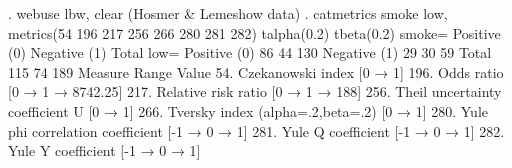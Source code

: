 . webuse lbw, clear
(Hosmer \& Lemeshow data)
{\smallskip}
. catmetrics smoke low, metrics(54 196 217 256 266 280 281 282) talpha(0.2) tbeta(0.2)
{\smallskip}
{}
{\smallskip}
      smoke= {\VBAR}    Positive (0)    Negative (1) {\VBAR}    Total 
        low= {\VBAR}                                 {\VBAR}
Positive (0) {\VBAR}              86              44 {\VBAR}      130 
Negative (1) {\VBAR}              29              30 {\VBAR}       59 
       Total {\VBAR}             115              74 {\VBAR}      189 
{\smallskip}
{}
Measure                                             Range     Value
54. Czekanowski index                             [0 → 1]  {}
196. Odds ratio                         [0 → 1 → 8742.25]  {}
217. Relative risk ratio                    [0 → 1 → 188]  {}
256. Theil uncertainty coefficient U              [0 → 1]  {}
266. Tversky index (alpha=.2,beta=.2)             [0 → 1]  {}
280. Yule phi correlation coefficient        [-1 → 0 → 1]  {}
281. Yule Q coefficient                      [-1 → 0 → 1]  {}
282. Yule Y coefficient                      [-1 → 0 → 1]  {}
{\smallskip}
{}
